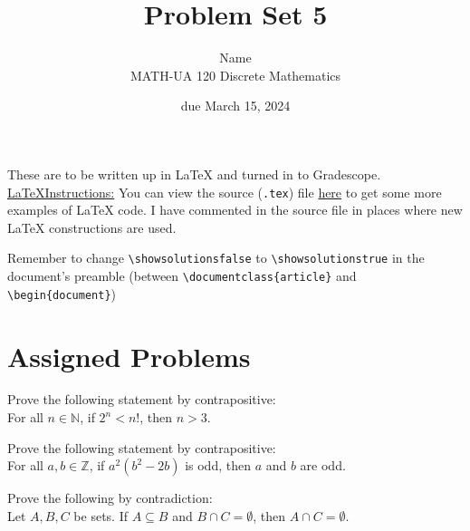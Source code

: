 \documentclass{article}
\title{Problem Set 5}
\author{%
    Name
\\  MATH-UA 120 Discrete Mathematics
}
\date{due March 15, 2024}
\newif\ifshowsolutions
\newcommand{\danger}{\marginpar[\hfill\dbend]{\dbend\hfill}}
\theoremstyle{definition}
\begin{document}
\maketitle



These are to be written up in \LaTeX{} and turned in to Gradescope.\\



\ifshowsolutions
    \SetupExSheets{solution/print=true}
\else
    \danger
 \underline{ \LaTeX  Instructions:}  You can view the source (\texttt{.tex}) file \href{}{here} to get some more examples of \LaTeX{} code.  I have commented in the source file in places where new \LaTeX{} constructions are used.
  
  Remember to change \verb|\showsolutionsfalse| to \verb|\showsolutionstrue|
    in the document's preamble 
    (between \verb|\documentclass{article}| and \verb|\begin{document}|)
\fi

\section*{Assigned Problems}

\begin{question}{5}
    Prove the following statement by contrapositive: \\
    For all $n\in \mathbb{N}$, if $2^n<n!$, then $n>3$.
\end{question}
\begin{solution}
\end{solution}

\begin{question}{5}
    Prove the following statement by contrapositive: \\
    For all $a, b\in \mathbb{Z}$, if $a^2(b^2-2b)$ is odd, then $a$ and $b$ are odd.
\end{question}
\begin{solution}
\end{solution}


\begin{question}{5}
    Prove the following by contradiction:\\
    Let $A, B, C$ be sets. If $A\subseteq B$ and $B\cap C=\emptyset$, then $A\cap C=\emptyset$.
\end{question}
\begin{solution}
\end{solution}
\end{document}

